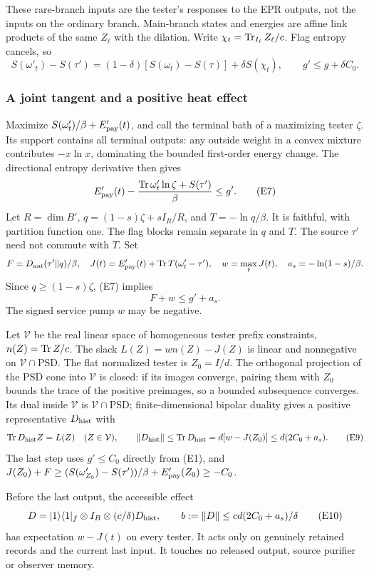 These rare-branch inputs are the tester's responses to the EPR outputs,
not the inputs on the ordinary branch. Main-branch states and energies
are affine link products of the same \(Z_\ell\) with the dilation.
Write \(\chi_t=\operatorname{Tr}_{I_\ell}Z_\ell/c\). Flag entropy cancels, so
\[
 S(\omega'_t)-S(\tau')
 =(1-\delta)[S(\omega_t)-S(\tau)]+\delta S(\chi_t),\qquad
 g'\le g+\delta C_0.                                \tag{E6}
\]

\subsubsection{A joint tangent and a positive heat effect}
Maximize \(S(\omega'_t)/\beta+E_{\rm pay}'(t)\), and call the terminal
bath of a maximizing tester \(\zeta\). Its support contains all terminal
outputs: any outside weight in a convex mixture contributes
\(-x\ln x\), dominating the bounded first-order energy change.
The directional entropy derivative then gives
\[
 E_{\rm pay}'(t)-\frac{\operatorname{Tr}\omega'_t\ln\zeta+S(\tau')}{\beta}
 \le g'.                                           \tag{E7}
\]
Let \(R=\dim B'\), \(q=(1-s)\zeta+sI_R/R\), and
\(T=-\ln q/\beta\). It is faithful, with partition function one.
The flag blocks remain separate in \(q\) and \(T\).
The source \(\tau'\) need not commute with \(T\).
Set
\[
 F=D_{\mathrm{nat}}(\tau'\|q)/\beta,\quad
 J(t)=E_{\rm pay}'(t)+\operatorname{Tr} T(\omega'_t-\tau'),\quad
 w=\max_tJ(t),\quad a_s=-\ln(1-s)/\beta.
\]
Since \(q\ge(1-s)\zeta\), (E7) implies
\[
 F+w\le g'+a_s.                                    \tag{E8}
\]
The signed service pump \(w\) may be negative.

Let \(\mathcal V\) be the real linear space of homogeneous tester
prefix constraints, \(n(Z)=\operatorname{Tr} Z/c\). The slack
\(L(Z)=w n(Z)-J(Z)\) is linear and nonnegative on
\(\mathcal V\cap\mathrm{PSD}\). The flat normalized tester is
\(Z_0=I/d\). The orthogonal projection of the PSD cone into
\(\mathcal V\) is closed: if its images converge, pairing them with
\(Z_0\) bounds the trace of the positive preimages, so a bounded
subsequence converges. Its dual inside \(\mathcal V\) is
\(\mathcal V\cap\mathrm{PSD}\); finite-dimensional bipolar duality gives
a positive representative \(D_{\rm hist}\) with
\[
 \operatorname{Tr} D_{\rm hist}Z=L(Z)\quad(Z\in\mathcal V),\qquad
 \|D_{\rm hist}\|\le\operatorname{Tr} D_{\rm hist}
 =d[w-J(Z_0)]\le d(2C_0+a_s).                       \tag{E9}
\]
The last step uses \(g'\le C_0\) directly from (E1), and
\(J(Z_0)+F\ge(S(\omega'_{Z_0})-S(\tau'))/\beta+E'_{\rm pay}(Z_0)
\ge-C_0\).

Before the last output, the accessible effect
\[
 D=|1\rangle\langle1|_f\otimes I_B\otimes
       (c/\delta)D_{\rm hist},\qquad
 b:=\|D\|\le cd(2C_0+a_s)/\delta                     \tag{E10}
\]
has expectation \(w-J(t)\) on every tester. It acts only on genuinely
retained records and the current last input. It touches no released
output, source purifier or observer memory.


